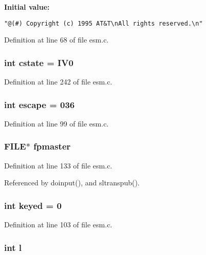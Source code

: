 {\bf Initial value:}

\footnotesize\begin{verbatim}
"@(#) Copyright (c) 1995 AT&T\nAll rights reserved.\n"
\end{verbatim}\normalsize 


Definition at line 68 of file esm.c.
\subsubsection{\setlength{\rightskip}{0pt plus 5cm}int {\bf cstate} = IV0}\label{esm_8c_a43}




Definition at line 242 of file esm.c.
\subsubsection{\setlength{\rightskip}{0pt plus 5cm}int {\bf escape} = 036}\label{esm_8c_a27}




Definition at line 99 of file esm.c.
\subsubsection{\setlength{\rightskip}{0pt plus 5cm}FILE$\ast$ {\bf fpmaster}}\label{esm_8c_a41}




Definition at line 133 of file esm.c.

Referenced by doinput(), and sltranspub().
\subsubsection{\setlength{\rightskip}{0pt plus 5cm}int {\bf keyed} = 0}\label{esm_8c_a30}




Definition at line 103 of file esm.c.
\subsubsection{\setlength{\rightskip}{0pt plus 5cm}int {\bf l}}\label{esm_8c_a34}





